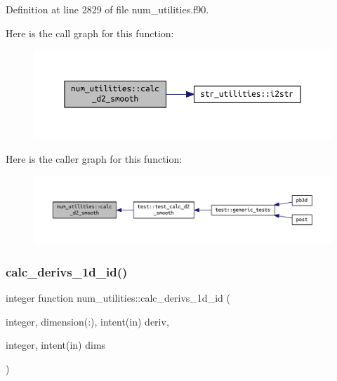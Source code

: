 Definition at line 2829 of file num\+\_\+utilities.\+f90.

Here is the call graph for this function\+:\nopagebreak
\begin{figure}[H]
\begin{center}
\leavevmode
\includegraphics[width=350pt]{namespacenum__utilities_ab4c91a6478c4dd6f519f8ccbccc4094f_cgraph}
\end{center}
\end{figure}
Here is the caller graph for this function\+:\nopagebreak
\begin{figure}[H]
\begin{center}
\leavevmode
\includegraphics[width=350pt]{namespacenum__utilities_ab4c91a6478c4dd6f519f8ccbccc4094f_icgraph}
\end{center}
\end{figure}
\mbox{\label{namespacenum__utilities_af2e9ffd7ce2f9391bf8b6f1c344fabca}} 
\subsubsection{\texorpdfstring{calc\+\_\+derivs\+\_\+1d\+\_\+id()}{calc\_derivs\_1d\_id()}}
{\footnotesize\ttfamily integer function num\+\_\+utilities\+::calc\+\_\+derivs\+\_\+1d\+\_\+id (\begin{DoxyParamCaption}\item[{integer, dimension(\+:), intent(in)}]{deriv,  }\item[{integer, intent(in)}]{dims }\end{DoxyParamCaption})}



